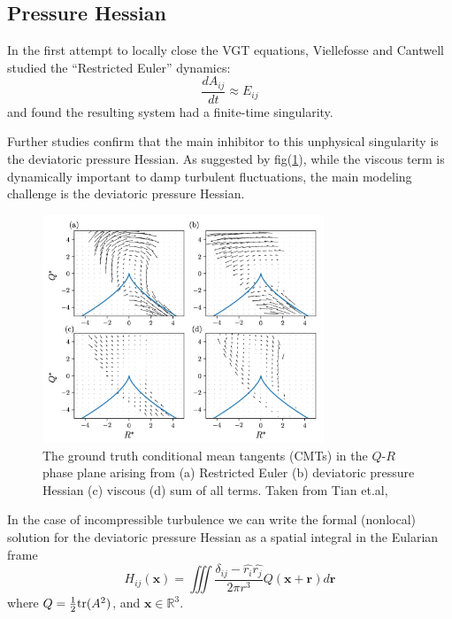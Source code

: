 \subsection{Pressure Hessian}
In the first attempt to locally close the VGT equations, Viellefosse \cite{vieillefosse1984} and Cantwell \cite{cantwell1992} studied the ``Restricted Euler'' dynamics:
\begin{equation}
    \frac{dA_{ij}}{dt} \approx E_{ij}
\end{equation}
and found the resulting system had a finite-time singularity.

Further studies confirm that the main inhibitor to this unphysical singularity is the deviatoric pressure Hessian. As suggested by fig(\ref{fig:gt_qr_cmt}), while the viscous term is dynamically important to damp turbulent fluctuations, the main modeling challenge is the deviatoric pressure Hessian.

\begin{figure}
    \centering
    \includegraphics[width=0.75\textwidth]{LagrangianDeformationModels/figs/tian_qr_cmt.png}
    \caption{The ground truth conditional mean tangents (CMTs) in the $Q\text{-}R$ phase plane arising from (a) Restricted Euler (b) deviatoric pressure Hessian (c) viscous (d) sum of all terms. Taken from Tian et.al, \color{red}{TODO generate this figure.}}
    \label{fig:gt_qr_cmt}
\end{figure}

In the case of incompressible turbulence we can write the formal (nonlocal) solution for the deviatoric pressure Hessian as a spatial integral \cite{ohkitani1995} in the Eularian frame
\begin{equation} \label{eq:nonlocal_solution}
    H_{ij}({\bm x}) = \iiint \frac{\delta_{ij} - \hat{r_i}\hat{r_j}}{2\pi r^3}Q({\bm x} + {\bm r})d{\bm r}
\end{equation}
where $Q = \frac{1}{2}\text{tr}(A^2)$, and ${\bm x}\in\mathbb{R}^3$.

